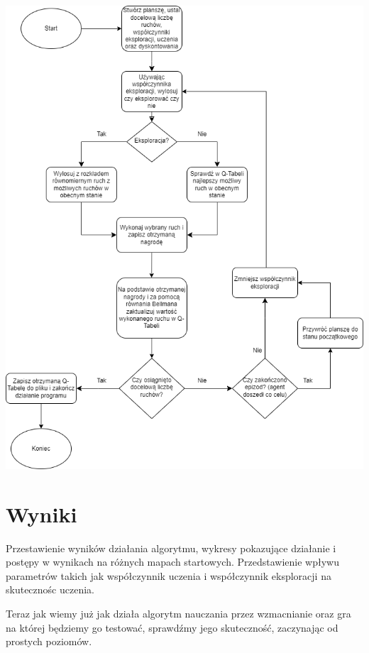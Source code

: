 \documentclass[a4paper,12pt]{article}
\begin{document}
\includegraphics[scale=0.6]{flowchart.png}

\section{Wyniki}

Przestawienie wyników działania algorytmu, wykresy pokazujące działanie i postępy w wynikach na różnych mapach startowych. Przedstawienie wpływu parametrów takich jak współczynnik uczenia i współczynnik eksploracji na skutecznośc uczenia.

Teraz jak wiemy już jak działa algorytm nauczania przez wzmacnianie oraz gra na której będziemy go testować, sprawdźmy jego skuteczność, zaczynając od prostych poziomów.
\end{document}
